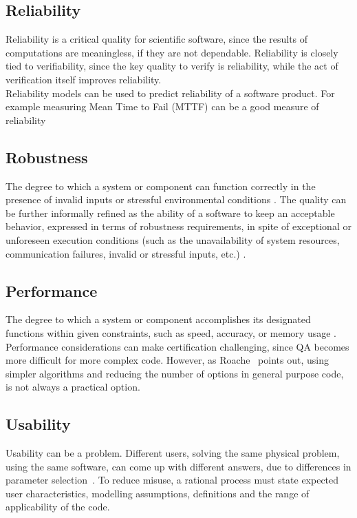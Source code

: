 \documentclass[letterpaper,cleveref]{lipics-v2019}
\begin{document}
\subsection{Reliability}

Reliability is a critical quality for scientific software, since the results of
computations are meaningless, if they are not dependable.  Reliability is
closely tied to verifiability, since the key quality to verify is reliability,
while the act of verification itself improves reliability.\\
Reliability models can be used to predict reliability of a software product. For example measuring Mean Time to Fail (MTTF) can be a good measure of reliability \cite{berander2005software}

\subsection{Robustness}
The degree to which a system or component can function correctly in the presence of invalid inputs or stressful environmental conditions \cite{IEEEStdGlossarySET1990}.
The quality can be further informally refined as the ability of a software to keep an acceptable behavior, expressed in terms of robustness requirements, in spite of exceptional or unforeseen execution conditions (such as the unavailability of system resources, communication failures, invalid or stressful inputs, etc.) \cite{fernandez2005model}.

\subsection{Performance}

The degree to which a system or component accomplishes its designated functions within given constraints, such as speed, accuracy, or memory usage \cite{IEEEStdGlossarySET1990}.
Performance considerations can make certification challenging, since QA becomes more difficult for more complex code.  However, as Roache~\cite[p.~355]{Roache1998} points out, using simpler algorithms and reducing the number of options in general purpose code, is not always a practical option.

\subsection{Usability}

Usability can be a problem.  Different users, solving the same physical problem,
using the same software, can come up with different answers, due to differences
in parameter selection~\cite[p.~370]{Roache1998}.  To reduce misuse, a rational
process must state expected user characteristics, modelling assumptions,
definitions and the range of applicability of the code.
\end{document}
